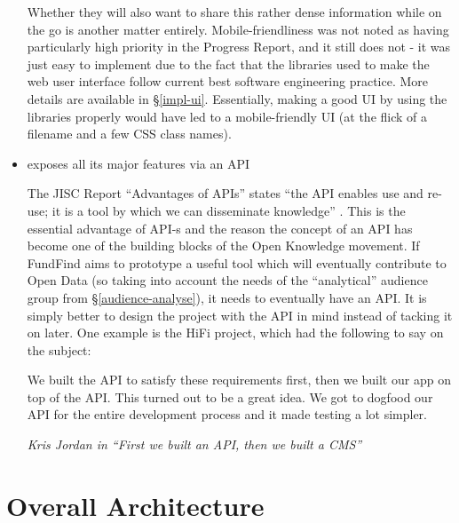 \begin{itemize}
 Whether they will also want to share this rather dense information while on the go is another matter entirely. Mobile-friendliness was not noted as having particularly high priority in the Progress Report, and it still does not - it was just easy to implement due to the fact that the libraries used to make the web user interface follow current best software engineering practice. More details are available in \S\ref{impl-ui}. Essentially, making a good UI by using the libraries properly would have led to a mobile-friendly UI (at the flick of a filename and a few CSS class names).
 
 \item exposes all its major features via an API
 
 The JISC Report ``Advantages of APIs'' states ``the API enables use and re-use; it is a tool by which we can disseminate knowledge'' \cite{advantages-apis}. This is the essential advantage of API-s and the reason the concept of an API has become one of the building blocks of the Open Knowledge movement. If FundFind aims to prototype a useful tool which will eventually contribute to Open Data (so taking into account the needs of the ``analytical'' audience group from \S\ref{audience-analyse}), it needs to eventually have an API. It is simply better to design the project with the API in mind instead of tacking it on later. One example is the HiFi project, which had the following to say on the subject:
 
 \begin{shadequote}
  We built the API to satisfy these requirements first, then we built our app on top of the API. This turned out to be a great idea. We got to dogfood our API for the entire development process and it made testing a lot simpler.
  \par\emph{Kris Jordan in ``First we built an API, then we built a CMS'' \cite{hifi-api}}
 \end{shadequote}
 
\end{itemize}

\section{Overall Architecture}

